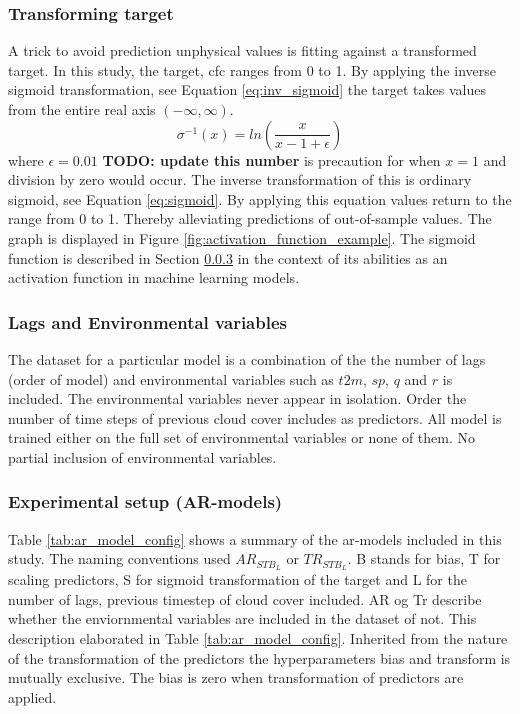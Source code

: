 \subsubsection{Transforming target} \label{sec:transforming_target}
A trick to avoid prediction unphysical values is fitting against a transformed target. In this study, the target, \acrfull{cfc} ranges from 0 to 1. By applying the inverse sigmoid transformation, see Equation \eqref{eq:inv_sigmoid} the target takes values from the entire real axis $(-\infty, \infty)$. 
\begin{equation} \label{eq:inv_sigmoid}
   \sigma^{-1} \left( x \right) = ln \left(\frac{x}{x - 1 + \epsilon} \right)
\end{equation}
where $\epsilon = 0.01$ \textbf{TODO: update this number} is precaution for when $x=1$ and division by zero would occur. 
The inverse transformation of this is ordinary sigmoid, see Equation \eqref{eq:sigmoid}. By applying this equation values return to the range from 0 to 1. Thereby alleviating predictions of out-of-sample values. The graph is displayed in Figure \ref{fig:activation_function_example}. The sigmoid function is described in Section \ref{} in the context of its abilities as an activation function in machine learning models. 

\subsubsection{Lags and Environmental variables}
The dataset for a particular model is a combination of the the number of lags (order of model) and environmental variables such as $t2m$, $sp$, $q$ and $r$ is included. The environmental variables never appear in isolation.
Order the number of time steps of previous cloud cover includes as predictors. All model is trained either on the full set of environmental variables or none of them. No partial inclusion of environmental variables. 

\subsubsection{Experimental setup (AR-models)}
Table \ref{tab:ar_model_config} shows a summary of the \acrshort{ar}-models included in this study. The naming conventions used $AR_{STB_L}$ or $TR_{STB_L}$. B stands for bias, T for scaling predictors, S for sigmoid transformation of the target and L for the number of lags, previous timestep of cloud cover included. AR og Tr describe whether the enviornmental variables are included in the dataset of not. This description elaborated in Table \ref{tab:ar_model_config}. Inherited from the nature of the transformation of the predictors the hyperparameters bias and transform is mutually exclusive. The bias is zero when transformation of predictors are applied. 

